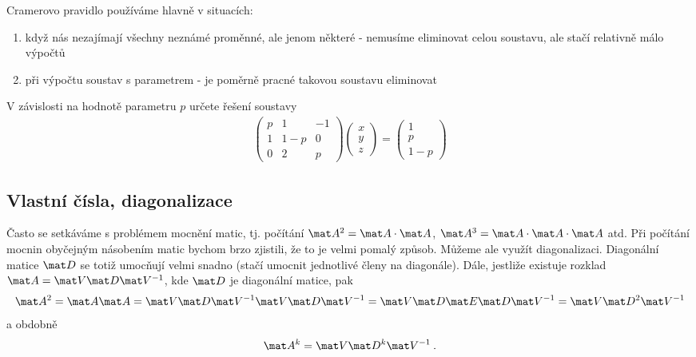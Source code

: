 Cramerovo pravidlo používáme hlavně v situacích:
\begin{enumerate}
    \item když nás nezajímají všechny neznámé proměnné, ale jenom některé - nemusíme eliminovat celou soustavu, ale stačí relativně málo výpočtů
    \item při výpočtu soustav s parametrem - je poměrně pracné takovou soustavu eliminovat
\end{enumerate}

\begin{example}
    V závislosti na hodnotě parametru $p$ určete řešení soustavy \begin{align}
        \begin{pmatrix}
            p & 1 & -1 \\ 1 & 1-p & 0 \\ 0 & 2 & p
        \end{pmatrix}
        \begin{pmatrix}
            x \\y \\ z
        \end{pmatrix}
        =
        \begin{pmatrix}
            1 \\ p \\ 1 - p
        \end{pmatrix}
    \end{align}
\end{example}

\subsection{Vlastní čísla, diagonalizace}

\begin{example}
    Často se setkáváme s problémem mocnění matic, tj. počítání $\mat A^2 = \mat A \cdot \mat A$, $\mat A^3 = \mat A \cdot \mat A \cdot \mat A$ atd. Při počítání mocnin obyčejným násobením matic bychom brzo zjistili, že to je velmi pomalý způsob. Můžeme ale využít diagonalizaci. Diagonální matice $\mat D$ se totiž umocňují velmi snadno (stačí umocnit jednotlivé členy na diagonále). Dále, jestliže existuje rozklad $\mat A = \mat V \mat D \mat V^{-1}$, kde $\mat D$ je diagonální matice, pak \begin{align}
        \mat A^2 = \mat A \mat A = \mat V \mat D \mat V^{-1} \mat V \mat D \mat V^{-1} 
        = \mat V \mat D \mat E \mat D \mat V^{-1} = \mat V \mat D^2 \mat V^{-1}
    \end{align}
    a obdobně \begin{align}
        \mat A^k = \mat V \mat D^k \mat V^{-1} \:.
    \end{align}
\end{example}

